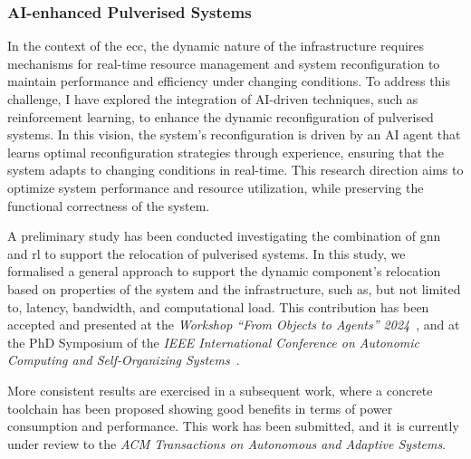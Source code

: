 \documentclass[runningheads]{llncs}
\begin{document}
\subsubsection{AI-enhanced Pulverised Systems}

In the context of the \ac{ecc},
the dynamic nature of the infrastructure requires mechanisms for real-time resource management and system reconfiguration to maintain performance and efficiency under changing conditions.
%
To address this challenge,
I have explored the integration of AI-driven techniques,
such as reinforcement learning,
to enhance the dynamic reconfiguration of pulverised systems.
%
In this vision,
the system's reconfiguration is driven by an AI agent that learns optimal reconfiguration strategies through experience,
ensuring that the system adapts to changing conditions in real-time.
%
This research direction aims to optimize system performance and resource utilization,
while preserving the functional correctness of the system.

A preliminary study has been conducted investigating the combination of \ac{gnn} and \ac{rl} to support the relocation of pulverised systems.
%
In this study,
we formalised a general approach to support the dynamic component's relocation based on properties of the system and the infrastructure,
such as, but not limited to,
latency,
bandwidth,
and computational load.
%
This contribution has been accepted and presented at the \emph{Workshop ``From Objects to Agents'' 2024}~\cite{DBLP:conf/woa/DominiFAV24},
and at the PhD Symposium of the \emph{IEEE International Conference on Autonomic Computing and Self-Organizing Systems}~\cite{DBLP:conf/acsos/Farabegoli24}.

More consistent results are exercised in a subsequent work,
where a concrete toolchain has been proposed showing good benefits in terms of power consumption and performance.
%
This work has been submitted,
and it is currently under review to the \emph{ACM Transactions on Autonomous and Adaptive Systems}.


\end{document}
